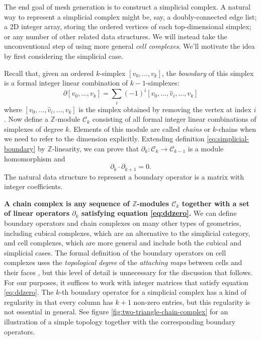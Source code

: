 \documentclass[twocolumn]{article}
\begin{document}
The end goal of mesh generation is to construct a simplicial complex.
A natural way to represent a simplicial complex might be, say, a doubly-connected edge list; a 2D integer array, storing the ordered vertices of each top-dimensional simplex; or any number of other related data structures.
We will instead take the unconventional step of using more general \emph{cell complexes}.
We'll motivate the idea by first considering the simplicial case.

Recall that, given an ordered $k$-simplex $[v_0, \ldots, v_k]$, the \emph{boundary} of this simplex is a formal integer linear combination of $k - 1$-simplexes:
\begin{equation}
    \partial[v_0, \ldots, v_k] = \sum_i(-1)^i[v_0, \ldots, \hat v_i, \ldots, v_k]
    \label{eq:simplicial-boundary}
\end{equation}
where $[v_0, \ldots, \hat v_i, \ldots, v_k]$ is the simplex obtained by removing the vertex at index $i$.
Now define a $\mathbb{Z}$-module $\mathscr{C}_k$ consisting of all formal integer linear combinations of simplexes of degree $k$.
Elements of this module are called \emph{chains} or $k$-chains when we need to refer to the dimension explicitly.
Extending definition \eqref{eq:simplicial-boundary} by $\mathbb{Z}$-linearity, we can prove that $\partial_k : \mathscr{C}_k \to \mathscr{C}_{k - 1}$ is a module homomorphism and
\begin{equation}
    \partial_k\cdot\partial_{k + 1} = 0.
    \label{eq:ddzero}
\end{equation}
The natural data structure to represent a boundary operator is a matrix with integer coefficients.

\textbf{A chain complex is any sequence of $\mathbb{Z}$-modules $\mathscr{C}_k$ together with a set of linear operators $\partial_k$ satisfying equation \eqref{eq:ddzero}.}
We can define boundary operators and chain complexes on many other types of geometries, including cubical complexes, which are an alternative to the simplicial category, and cell complexes, which are more general and include both the cubical and simplicial cases.
The formal definition of the boundary operators on cell complexes uses the \emph{topological degree} of the \emph{attaching maps} between cells and their faces \cite{hatcher2002algebraic}, but this level of detail is unnecessary for the discussion that follows.
For our purposes, it suffices to work with integer matrices that satisfy equation \eqref{eq:ddzero}.
The $k$-th boundary operator for a simplicial complex has a kind of regularity in that every column has $k + 1$ non-zero entries, but this regularity is not essential in general.
See figure \ref{fig:two-triangle-chain-complex} for an illustration of a simple topology together with the corresponding boundary operators.
\end{document}
